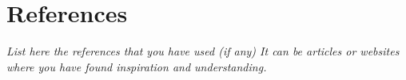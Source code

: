 \documentclass[a4paper, english]{article}
\numberwithin{equation}{section}
\begin{document}
\section{References}
\textit{List here the references that you have used (if any) It can be articles or websites where you have found inspiration and understanding.}

%
%




%
\end{document}
